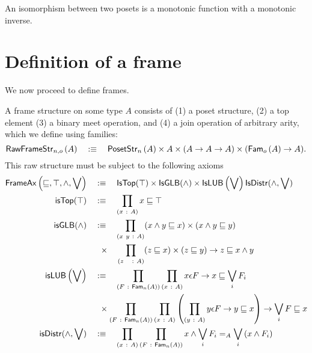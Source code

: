 \begin{defn}
  An isomorphism between two posets is a monotonic function with a monotonic inverse.
\end{defn}

\section{Definition of a frame}\label{sec:frame}

We now proceed to define frames.
\begin{defn}[Frame]\label{defn:frame}
  A frame structure on some type $A$ consists of (1) a poset structure, (2) a top element
  (3) a binary meet operation, and (4) a join operation of arbitrary arity, which we
  define using families:
  \begin{equation*}
    \mathsf{RawFrameStr}{}_{n, o}\left(A\right) \quad:\equiv\quad \mathsf{PosetStr}{}_{n}\left(A\right) \times A \times (A \rightarrow A \rightarrow A) \times (\mathsf{Fam}_{o}\left(A\right) \rightarrow A).
  \end{equation*}
  This raw structure must be subject to the following axioms
  \begin{align*}
    \frameax{\sqsubseteq, \top, \wedge, \bigvee} \quad&\is\quad
      \mathsf{IsTop}(\top) \times \mathsf{IsGLB}(\wedge) \times \mathsf{IsLUB}\left( \bigvee \right)
      \mathsf{IsDistr}(\wedge, \bigvee)\\
    \mathsf{isTop}(\top) \quad&\is\quad \pity{x}{A}{x \sqsubseteq \top}\\
    \mathsf{isGLB}(\wedge) \quad&\is\quad \pity{x~y}{A}{(x \wedge y \sqsubseteq x) \times (x \wedge y \sqsubseteq y)}\\
                       &\hspace{0.5em}\times\quad \pity{z~~}{A}{(z \sqsubseteq x) \times (z \sqsubseteq y) \rightarrow z \sqsubseteq x \wedge y}\\
    \mathsf{isLUB}\left(\bigvee\right) \quad&\is\quad
         \pity{F}{\sub{n}{A}}{\pity{x}{A}{x \epsilon F \rightarrow x \sqsubseteq \bigvee_i F_i}}\\
         &\hspace{0.5em}\times \pity{F}{\sub{n}{A}}{\pity{x}{A}{
               \left( \pity{y}{A}{y \epsilon F \rightarrow y \sqsubseteq x}\right) \rightarrow \bigvee_i F \sqsubseteq x
             }}\\
    \mathsf{isDistr}(\wedge, \bigvee) \quad&\is\quad
      \pity{x}{A}{\pity{F}{\sub{n}{A}}{
          x \wedge \bigvee_i F_i} =_A \bigvee_i \left( x \wedge F_i \right)
      }
  \end{align*}
\end{defn}

